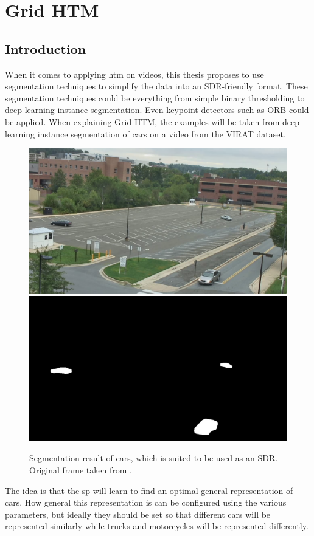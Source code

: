 \chapter{Grid HTM}
\label{sec:grid_htm}
\section{Introduction}
When it comes to applying \gls*{htm} on videos, this thesis proposes to use segmentation techniques to simplify the data into an SDR-friendly format. These segmentation techniques could be everything from simple binary thresholding to deep learning instance segmentation. Even keypoint detectors such as ORB\cite{orb_detector} could be applied. When explaining Grid HTM, the examples will be taken from deep learning instance segmentation of cars on a video from the VIRAT \cite{VIRAT} dataset.
\begin{figure}[H]
    \centering
    \includegraphics[width=.45\textwidth]{resources/methodology/original.png}
    \includegraphics[width=.45\textwidth]{resources/methodology/car_segmentation.png}
    \caption{Segmentation result of cars, which is suited to be used as an SDR. Original frame taken from \cite{VIRAT}.}
\end{figure}
The idea is that the \gls*{sp} will learn to find an optimal general representation of cars. How general this representation is can be configured using the various parameters, but ideally they should be set so that different cars will be represented similarly while trucks and motorcycles will be represented differently.
